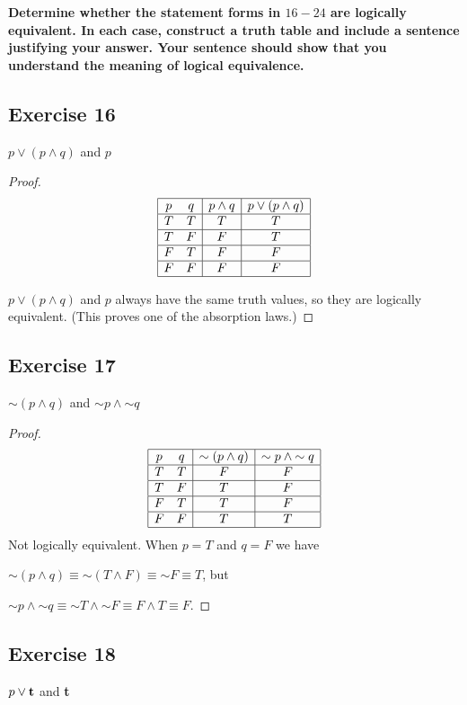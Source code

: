 \documentclass[14pt]{extarticle}
\newcommand{\true}{{\bf t}}
\begin{document}
{\bf Determine whether the statement forms in $16-24$ are logically equivalent.
In each case, construct a truth table and include a sentence justifying your
answer. Your sentence should show that you understand the meaning of logical
equivalence.}

\subsection{Exercise 16}
$p \vee (p \wedge q)$ and $p$

\begin{proof}
$$
\begin{array}{|cc|c|c|}
\hline
p & q & p \wedge q & p \vee (p \wedge q) \\
\hline
T & T & T & T \\
\hline
T & F & F & T \\
\hline
F & T & F & F \\
\hline
F & F & F & F \\
\hline
\end{array}
$$

$p \vee (p \wedge q)$ and $p$ always have the same truth values, so they are
logically equivalent. (This proves one of the absorption laws.)
\end{proof}

\subsection{Exercise 17}
${\sim(p \wedge q)}$ and ${\sim p} \wedge {\sim q}$

\begin{proof}
$$
\begin{array}{|cc|c|c|}
\hline
p & q & {\sim(p \wedge q)} & {\sim p} \wedge {\sim q} \\
\hline
T & T & F & F \\
\hline
T & F & T & F \\
\hline
F & T & T & F \\
\hline
F & F & T & T \\
\hline
\end{array}
$$
Not logically equivalent. When $p = T$ and $q = F$ we have

${\sim (p \wedge q)} \equiv {\sim (T \wedge F)} \equiv {\sim F} \equiv T$, but

${\sim p} \wedge {\sim q} \equiv {\sim T \wedge {\sim F}} \equiv
F \wedge T \equiv F$.
\end{proof}

\subsection{Exercise 18}
$p \vee \true$ and \true
\end{document}

